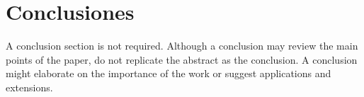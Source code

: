 \documentclass[a4paper]{IEEEtran} %
\begin{document}

\section{Conclusiones}
A conclusion section is not required. Although a conclusion may review the
main points of the paper, do not replicate the abstract as the conclusion. A
conclusion might elaborate on the importance of the work or suggest
applications and extensions.




\end{document}
